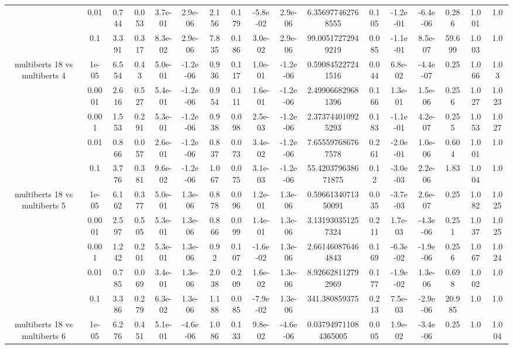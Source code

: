 \begin{tabular}{|c|c|c|c|c|c|c|c|c|c|c|c|c|c|c|c|c|}
 & 0.01 & 0.744 & 0.053 & 3.7e-01 & 2.9e-06 & 2.156 & 0.179 & -5.8e-02 & 2.9e-06 & 6.356977462768555 & 0.105 & -1.2e-01 & -6.4e-06 & 0.286 & 1.001 & 1.0 \\
 & 0.1 & 3.391 & 0.317 & 8.3e-02 & 2.9e-06 & 7.835 & 0.186 & 3.0e-02 & 2.9e-06 & 99.00517272949219 & 0.085 & -1.1e-01 & 8.5e-07 & 59.699 & 1.003 & 1.0 \\
\hline
\multirow{5}{*}{multiberts 18 vs multiberts 4} & 1e-05 & 6.554 & 0.43 & 5.0e-01 & -1.2e-06 & 0.936 & 0.117 & 1.0e-01 & -1.2e-06 & 0.590845227241516 & 0.044 & 6.8e-02 & -4.4e-07 & 0.25 & 1.066 & 1.03 \\
 & 0.0001 & 2.616 & 0.527 & 5.4e-01 & -1.2e-06 & 0.954 & 0.111 & 1.6e-01 & -1.2e-06 & 2.499066829681396 & 0.166 & 1.3e-01 & 1.5e-06 & 0.256 & 1.027 & 1.023 \\
 & 0.001 & 1.553 & 0.291 & 5.3e-01 & -1.2e-06 & 0.938 & 0.098 & 2.5e-03 & -1.2e-06 & 2.373744010925293 & 0.183 & -1.1e-01 & 4.2e-07 & 0.255 & 1.053 & 1.027 \\
 & 0.01 & 0.866 & 0.057 & 2.6e-01 & -1.2e-06 & 0.837 & 0.073 & 3.4e-02 & -1.2e-06 & 7.655597686767578 & 0.261 & -2.0e-01 & 1.0e-06 & 0.604 & 1.001 & 1.0 \\
 & 0.1 & 3.776 & 0.381 & 9.6e-02 & -1.2e-06 & 1.067 & 0.075 & 3.1e-03 & -1.2e-06 & 55.420379638671875 & 0.12 & -3.0e-03 & 2.2e-06 & 1.83 & 1.004 & 1.0 \\
\hline
\multirow{5}{*}{multiberts 18 vs multiberts 5} & 1e-05 & 6.162 & 0.377 & 5.0e-01 & 1.3e-06 & 0.878 & 0.096 & 1.2e-01 & 1.3e-06 & 0.5966134071350091 & 0.035 & -3.7e-03 & 2.6e-07 & 0.25 & 1.082 & 1.025 \\
 & 0.0001 & 2.597 & 0.505 & 5.3e-01 & 1.3e-06 & 0.866 & 0.099 & 1.4e-01 & 1.3e-06 & 3.131930351257324 & 0.211 & 1.7e-03 & -4.3e-06 & 0.251 & 1.037 & 1.025 \\
 & 0.001 & 1.242 & 0.201 & 5.3e-01 & 1.3e-06 & 0.92 & 0.107 & -1.6e-02 & 1.3e-06 & 2.661460876464843 & 0.169 & -6.3e-02 & -1.9e-06 & 0.256 & 1.067 & 1.024 \\
 & 0.01 & 0.785 & 0.069 & 3.4e-01 & 1.3e-06 & 2.038 & 0.209 & 1.6e-02 & 1.3e-06 & 8.926628112792969 & 0.177 & -1.9e-02 & 1.3e-06 & 0.698 & 1.002 & 1.0 \\
 & 0.1 & 3.386 & 0.279 & 6.3e-02 & 1.3e-06 & 1.188 & 0.085 & -7.9e-02 & 1.3e-06 & 341.380859375 & 0.213 & 7.5e-03 & -2.9e-06 & 20.985 & 1.0 & 1.0 \\
\hline
\multirow{5}{*}{multiberts 18 vs multiberts 6} & 1e-05 & 6.276 & 0.451 & 5.1e-01 & -4.6e-06 & 1.086 & 0.133 & 9.8e-02 & -4.6e-06 & 0.037949711084365005 & 0.005 & 1.9e-02 & -3.4e-06 & 0.25 & 1.0 & 1.004 \\

\end{tabular}

